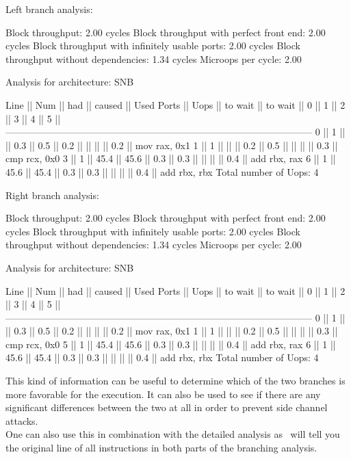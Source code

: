 \begin{example}
Left branch analysis:

Block throughput: 2.00 cycles
Block throughput with perfect front end: 2.00 cycles
Block throughput with infinitely usable ports: 2.00 cycles
Block throughput without dependencies: 1.34 cycles
Microops per cycle: 2.00

Analysis for architecture: SNB

 Line  ||   Num   ||   had   || caused  ||            Used Ports
       ||   Uops  || to wait || to wait ||   0   ||   1   ||   2   ||   3   ||   4   ||   5   ||
 ------------------------------------------------------------------------------------------------
   0   ||    1    ||         ||   0.3   ||  0.5  ||  0.2  ||       ||       ||       ||  0.2  || mov rax, 0x1
   1   ||    1    ||         ||         ||  0.2  ||  0.5  ||       ||       ||       ||  0.3  || cmp rcx, 0x0
   3   ||    1    ||  45.4   ||  45.6   ||  0.3  ||  0.3  ||       ||       ||       ||  0.4  || add rbx, rax
   6   ||    1    ||  45.6   ||  45.4   ||  0.3  ||  0.3  ||       ||       ||       ||  0.4  || add rbx, rbx
Total number of Uops: 4


Right branch analysis:

Block throughput: 2.00 cycles
Block throughput with perfect front end: 2.00 cycles
Block throughput with infinitely usable ports: 2.00 cycles
Block throughput without dependencies: 1.34 cycles
Microops per cycle: 2.00

Analysis for architecture: SNB

 Line  ||   Num   ||   had   || caused  ||            Used Ports
       ||   Uops  || to wait || to wait ||   0   ||   1   ||   2   ||   3   ||   4   ||   5   ||
 ------------------------------------------------------------------------------------------------
   0   ||    1    ||         ||   0.3   ||  0.5  ||  0.2  ||       ||       ||       ||  0.2  || mov rax, 0x1
   1   ||    1    ||         ||         ||  0.2  ||  0.5  ||       ||       ||       ||  0.3  || cmp rcx, 0x0
   5   ||    1    ||  45.4   ||  45.6   ||  0.3  ||  0.3  ||       ||       ||       ||  0.4  || add rbx, rax
   6   ||    1    ||  45.6   ||  45.4   ||  0.3  ||  0.3  ||       ||       ||       ||  0.4  || add rbx, rbx
Total number of Uops: 4
\end{example}

This kind of information can be useful to determine which of the two branches is more favorable for the execution. It can also be used to see if there are any significant differences between the two at all in order to prevent side channel attacks.\\
One can also use this in combination with the detailed analysis as \suaca\ will tell you the original line of all instructions in both parts of the branching analysis.


